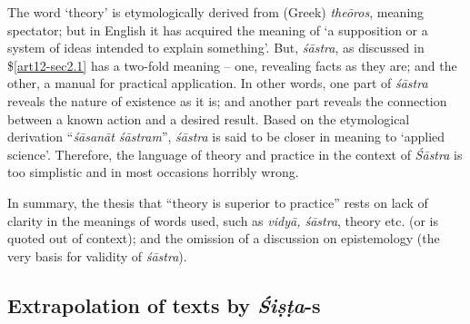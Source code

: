 The word `theory' is etymologically derived from (Greek) {\sl theōros}, meaning spectator; but in English it has acquired the meaning of `a supposition or a system of ideas intended to explain something'. But, {\sl śāstra}, as discussed in \$\ref{art12-sec2.1} has a two-fold meaning -- one, revealing facts as they are; and the other, a manual for practical application. In other words, one part of {\sl śāstra} reveals the nature of existence as it is; and another part reveals the connection between a known action and a desired result. Based on the etymological derivation ``{\sl śāsanāt śāstram}'', {\sl śāstra} is said to be closer in meaning to `applied science'. Therefore, the language of theory and practice in the context of {\sl Śāstra} is too simplistic and in most occasions horribly wrong. 

In summary, the thesis that ``theory is superior to practice'' rests on lack of clarity in the meanings of words used, such as {\sl vidyā, śāstra}, theory etc. (or is quoted out of context); and the omission of a discussion on epistemology (the very basis for validity of {\sl śāstra}).

\subsection{Extrapolation of texts by {{\sl\bfseries Śiṣṭa}\relax}-s}\label{art12-sec3.6}

